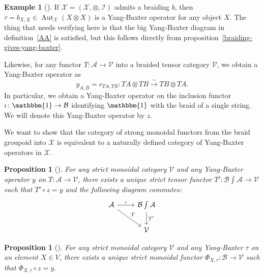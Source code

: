 \documentclass[reqno]{amsart}
\newtheorem{proposition}[theorem]{Proposition}
\theoremstyle{definition}
\newtheorem{example}[theorem]{Example}
\theoremstyle{remark}
\DeclareMathOperator{\Aut}{Aut}
\begin{document}
     \begin{example}[]
         If $\mathcal{X} = \left( 
         \mathcal{X, \otimes, I}\right) $ admits a braiding
         $b$, then $\tau = b_{X,X} \in 
         \Aut_{\mathcal{X}} \left( X \otimes X \right) $ 
         is a Yang-Baxter operator for any object
         $X$. The thing that needs verifying here
         is that the big Yang-Baxter diagram in definition~\ref{AA}
         is satisfied, but
         this follows directly from
         proposition~\ref{braiding-gives-yang-baxter}.

         Likewise, for any functor
         $T \colon \mathcal{A} \to \mathcal{V}$ into a 
         braided tensor category $\mathcal{V}$, we obtain
         a Yang-Baxter operator as
         \[
         y_{A,B} = c_{TA,TB} \colon TA \otimes TB
         \stackrel{\sim}{\to } TB \otimes TA.
         \] 
         In particular, we obtain a Yang-Baxter operator
         on the inclusion functor 
         $\iota \colon \mathbbm{1} \to \mathcal{B}$ 
         identifying $\mathbbm{1}$ with the braid
         of a single string. We will
         denote this Yang-Baxter operator by $z$.
     \end{example}


     We want to show that the category of strong
     monoidal functors from the braid groupoid
     into $\mathcal{X}$ is equivalent to a naturally
     defined category of Yang-Baxter operators in
     $\mathcal{X}$.

     \begin{proposition}[]
         For any strict monoidal category $\mathcal{V}$ and
         any Yang-Baxter operator $y$ on $T \colon
         \mathcal{A} \to \mathcal{V}$, there exists
         a unique strict tensor functor
         $T' \colon \mathcal{B} \int \mathcal{A} \to \mathcal{V}$ 
         such that $T' \circ z = y$ and
         the following diagram commutes:
         \begin{equation*}
         \begin{tikzcd}
             \mathcal{A} \ar[r, "\iota"] \ar[rd, "T"] & 
             \mathcal{B} \int \mathcal{A} \ar[d, "T'"] \\
                                                      & \mathcal{V}
         \end{tikzcd}
         \end{equation*}
         
     \end{proposition}

     \begin{proposition}[]
         For any strict monoidal category $\mathcal{V}$ and
         any Yang-Baxter $\tau$ on an element $X \in V$, there
         exists a unique strict monoidal functor
         $\Phi_{X, \tau} \colon \mathcal{B} \to \mathcal{V}$ such that
         $\Phi_{X, \tau} \circ z = y$.
     \end{proposition}
\end{document}
